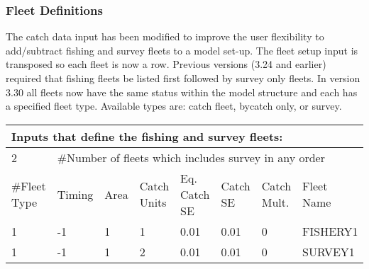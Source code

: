 \subsubsection{Fleet Definitions }
The catch data input has been modified to improve the user flexibility to add/subtract fishing and survey fleets to a model set-up.  The fleet setup input is transposed so each fleet is now a row.  Previous versions (3.24 and earlier) required that fishing fleets be listed first followed by survey only fleets.  In version 3.30 all fleets now have the same status within the model structure and each has a specified fleet type.  Available types are: catch fleet, bycatch only, or survey.  

\begin{center}
	\begin{tabular}{p{1.6cm} p{1.6cm} p{1.6cm} p{1.6cm} p{1.9cm} p{1.6cm} p{1.6cm} p{1.7cm}}
		\multicolumn{8}{l}{Inputs that define the fishing and survey fleets:}\\
		\hline
		2 & \multicolumn{7}{l}{\#Number of fleets which includes survey in any order} \\
		\hline
		\#Fleet Type & 
		Timing & 
		Area & 
		Catch Units & 
		Eq. Catch SE & 
		Catch SE & 
		Catch Mult. &
	    Fleet Name \\
		
		\hline
		1 & -1 & 1 & 1 & 0.01 & 0.01 & 0 & FISHERY1\\
		1 & -1 & 1 & 2 & 0.01 & 0.01 & 0 & SURVEY1\\
		\hline
		
	\end{tabular}
\end{center}

